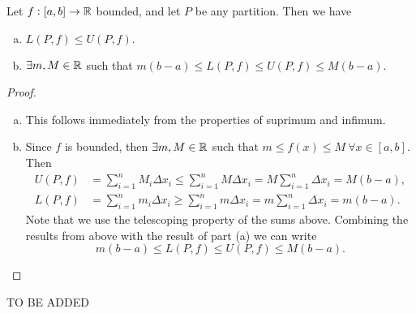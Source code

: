 \begin{proposition}
	Let $f: [a,b] \to \mathbb{R}$ bounded, and let $P$ be any partition. Then we have
	\begin{enumerate}[(a)]
		\item $L(P,f) \leq U(P,f).$
		\item $\exists m,M \in \mathbb{R}$ such that $m(b-a) \leq L(P,f) \leq U(P,f) \leq M(b-a)$.
	\end{enumerate}

\end{proposition}
\begin{proof}
	\begin{enumerate}[(a)]
		\item This follows immediately from the properties of suprimum and infimum.
		\item Since $f$ is bounded, then $\exists m,M \in \mathbb{R}$ such that $m \leq f(x) \leq M\ \forall x \in [a,b]$. Then
		\begin{align*}
			U(P,f) &= \sum_{i=1}^{n} M_i \Delta x_i \leq \sum_{i=1}^{n} M \Delta x_i = M \sum_{i=1}^{n} \Delta x_i  = M(b-a),\\
			L(P,f) &= \sum_{i=1}^{n} m_i \Delta x_i \geq \sum_{i=1}^{n} m \Delta x_i = m \sum_{i=1}^{n} \Delta x_i  = m(b-a).
		\end{align*}
		Note that we use the telescoping property of the sums above. Combining the results from above with the result of part (a) we can write
		\[ m(b-a) \leq L(P,f) \leq U(P,f) \leq M(b-a). \] 
	\end{enumerate}
\end{proof}


\begin{definition}
	TO BE ADDED
\end{definition}

